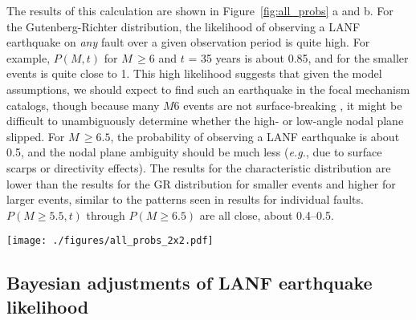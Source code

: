 \documentclass[twocolumn,grl]{AGUTeX}
\begin{document}
\begin{article}
The results of this calculation are shown in Figure~\ref{fig:all_probs} a and b.
For the Gutenberg-Richter distribution, the likelihood of observing a LANF
earthquake on \emph{any} fault over a given observation period is quite high.
For example, $P(M,t)$ for $M \, \ge 6$ and $t$ = 35 years is about 0.85, and
for the smaller events is quite close to 1.  This high likelihood suggests that
given the model assumptions, we should expect to find such an earthquake in the
focal mechanism catalogs, though because many $M6$ events are not
surface-breaking \citep{hecker2013eqdist}, it might be difficult to
unambiguously determine whether the high- or low-angle nodal plane slipped.
For $M \, \ge 6.5$, the probability of observing a LANF earthquake is about
0.5, and the nodal plane ambiguity should be much less ({\it e.g.}, due to
surface scarps or directivity effects).  The results for the characteristic
distribution are lower than the results for the GR distribution for smaller
events and higher for larger events, similar to the patterns seen in results
for individual faults. $P(M\ge5.5,t)$ through $P(M\ge6.5)$ are all close, about
0.4--0.5.


\begin{figure*}%
\noindent\texttt{[image: ./figures/all\_probs\_2x2.pdf]}

\caption{\textbf{a:} Probabilities of observing an earthquake greater than or
equal to a given moment magnitude \emph{M} over a given observation window on
any LANF, given a Gutenberg-Richter distribution.  \textbf{b:} Probabilities of
observing an earthquake greater than or equal to a given moment magnitude
\emph{M} over a given observation window on any LANF, given a characteristic
distribution.  \textbf{c:} Cross-section through \textbf{a} at $t$ = 35 years
showing probability distributions.  \textbf{d:} Cross-section through
\textbf{b} at $t$ = 35 years showing probability distributions.}

\label{fig:all_probs}
\end{figure*}

\subsection{Bayesian adjustments of LANF earthquake likelihood}


\end{article}
\end{document}
